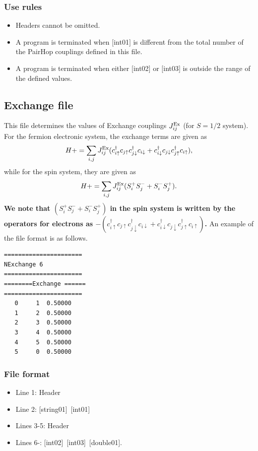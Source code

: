 \subsubsection{Use rules}
\begin{itemize}
\item Headers cannot be omitted. 
\item A program is terminated when $[$int01$]$ is different from the total number of the PairHop couplings defined in this file.
\item A program is terminated when either $[$int02$]$ or $[$int03$]$ is outside the range of the defined values.
\end{itemize}

\newpage
\subsection{Exchange file}
This file determines the values of Exchange couplings $J_{ij}^{\rm Ex}$ {(for $S=1/2$ system)}.
For the fermion electronic system, the exchange terms are given as
\begin{equation}
H+=\sum_{i,j}J_{ij}^{\rm Ex} (c_ {i \uparrow}^{\dag}c_{j\uparrow}c_{j \downarrow}^{\dag}c_{i  \downarrow}+c_ {i \downarrow}^{\dag}c_{j\downarrow}c_{j \uparrow}^{\dag}c_{i  \uparrow}),
\end{equation}
while for the spin system, they are given as
\begin{equation}
H+=\sum_{i,j}J_{ij}^{\rm Ex} (S_ {i}^{+}S_{j}^-+ S_ {i}^{-}S_{j}^+).
\end{equation}
{\bf We note that $(S_i^+S_j^-+S_i^-S_j^+)$ in the spin system is written by the
operators for electrons as 
$-(c_ {i \uparrow}^{\dag}c_{j\uparrow}c_{j \downarrow}^{\dag}c_{i  \downarrow}
+c_ {i \downarrow}^{\dag}c_{j\downarrow}c_{j \uparrow}^{\dag}c_{i  \uparrow})$.
}
An example of the file format is as follows.

\begin{minipage}{12.5cm}
\begin{screen}
\begin{verbatim}
====================== 
NExchange 6  
====================== 
========Exchange ====== 
====================== 
   0     1  0.50000
   1     2  0.50000
   2     3  0.50000
   3     4  0.50000
   4     5  0.50000
   5     0  0.50000
\end{verbatim}
\end{screen}
\end{minipage}

\subsubsection{File format}
 \begin{itemize}
   \item  Line 1:  Header
   \item  Line 2:   [string01]~[int01]
   \item  Lines 3-5:  Header
   \item  Lines 6-: 
   [int02]~[int03]~[double01].
  \end{itemize}
